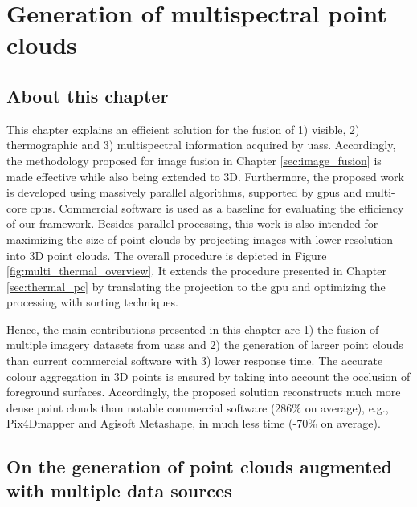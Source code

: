 \setchapterpreamble[u]{\margintoc}
\chapter{Generation of multispectral point clouds}
\label{sec:multispectral_pc}

\section*{About this chapter}

This chapter explains an efficient solution for the fusion of 1) visible, 2) thermographic and 3) multispectral information acquired by \acrshort{uas}s. Accordingly, the methodology proposed for image fusion in Chapter \ref{sec:image_fusion} is made effective while also being extended to 3D. Furthermore, the proposed work is developed using massively parallel algorithms, supported by \acrshort{gpu}s and multi-core \acrshort{cpu}s. Commercial software is used as a baseline for evaluating the efficiency of our framework. Besides parallel processing, this work is also intended for maximizing the size of point clouds by projecting images with lower resolution into 3D point clouds. The overall procedure is depicted in Figure \ref{fig:multi_thermal_overview}. It extends the procedure presented in Chapter \ref{sec:thermal_pc} by translating the projection to the \acrshort{gpu} and optimizing the processing with sorting techniques.

Hence, the main contributions presented in this chapter are 1) the fusion of multiple imagery datasets from \acrshort{uas}s and 2) the generation of larger point clouds than current commercial software with 3) lower response time. The accurate colour aggregation in 3D points is ensured by taking into account the occlusion of foreground surfaces. Accordingly, the proposed solution reconstructs much more dense point clouds than notable commercial software (286\% on average), e.g., Pix4Dmapper and Agisoft Metashape, in much less time (-70\% on average). 

\section{On the generation of point clouds augmented with multiple data sources}

